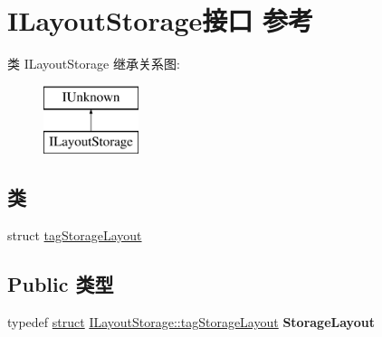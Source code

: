 \hypertarget{interface_i_layout_storage}{}\section{I\+Layout\+Storage接口 参考}
\label{interface_i_layout_storage}
类 I\+Layout\+Storage 继承关系图\+:\begin{figure}[H]
\begin{center}
\leavevmode
\includegraphics[height=2.000000cm]{interface_i_layout_storage}
\end{center}
\end{figure}
\subsection*{类}
\begin{DoxyCompactItemize}
\item 
struct \hyperlink{struct_i_layout_storage_1_1tag_storage_layout}{tag\+Storage\+Layout}
\end{DoxyCompactItemize}
\subsection*{Public 类型}
\begin{DoxyCompactItemize}
\item 
\mbox{\label{interface_i_layout_storage_ae8a176bd0ed02331b9e856c1195d6f30}} 
typedef \hyperlink{interfacestruct}{struct} \hyperlink{struct_i_layout_storage_1_1tag_storage_layout}{I\+Layout\+Storage\+::tag\+Storage\+Layout} {\bfseries Storage\+Layout}
\end{DoxyCompactItemize}
